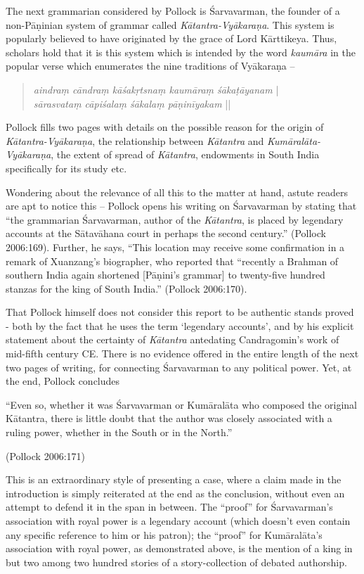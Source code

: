 The next grammarian considered by Pollock is Śarvavarman, the founder of a non-Pāṇinian system of grammar called {\sl Kātantra-Vyākaraṇa}. This system is popularly believed to have originated by the grace of Lord Kārttikeya. Thus, scholars hold that it is this system which is intended by the word {\sl kaumāra} in the popular verse which enumerates the nine traditions of Vyākaraṇa --
\begin{quote}
{{\sl aindraṃ cāndraṃ kāśakṛtsnaṃ kaumāraṃ śākaṭāyanam}} |\\ 
{{\sl sārasvataṃ cāpiśalaṃ śākalaṃ pāṇinīyakam}} || 
\end{quote}

\newpage

Pollock fills two pages with details on the possible reason for the origin of {\sl Kātantra-Vyākaraṇa}, the relationship between {\sl Kātantra} and {\sl Kumāralāta-Vyākaraṇa}, the extent of spread of {\sl Kātantra}, endowments in South India specifically for its study etc. 

Wondering about the relevance of all this to the matter at hand, astute readers are apt to notice this -- Pollock opens his writing on Śarvavarman by stating that ``the grammarian Śarvavarman, author of the {\sl Kātantra}, is placed by legendary accounts at the Sātavāhana court in perhaps the second century.'' (Pollock 2006:169). Further, he says, ``This location may receive some confirmation in a remark of Xuanzang's biographer, who reported that ``recently a Brahman of southern India again shortened [Pāṇini’s grammar] to twenty-five hundred stanzas for the king of South India.'' (Pollock 2006:170). 

That Pollock himself does not consider this report to be authentic stands proved - both by the fact that he uses the term `legendary accounts', and by his explicit statement about the certainty of {\sl Kātantra} antedating Candragomin's work of mid-fifth century CE. There is no evidence offered in the entire length of the next two pages of writing, for connecting Śarvavarman to any political power. Yet, at the end, Pollock concludes 

\begin{myquote}
``Even so, whether it was Śarvavarman or Kumāralāta who composed the original Kātantra, there is little doubt that the author was closely associated with a ruling power, whether in the South or in the North.''

\hfill (Pollock 2006:171) 
\end{myquote}
This is an extraordinary style  of presenting a case, where a claim made in the introduction is simply reiterated at the end as the conclusion, without even an attempt to defend it in the span in between. The ``proof'' for Śarvavarman’s association with royal power is a legendary account (which doesn't even contain any specific reference to him or his patron); the ``proof'' for Kumāralāta's association with royal power, as demonstrated above, is the mention of a king in but two among two hundred stories of a story-collection of debated authorship. 

